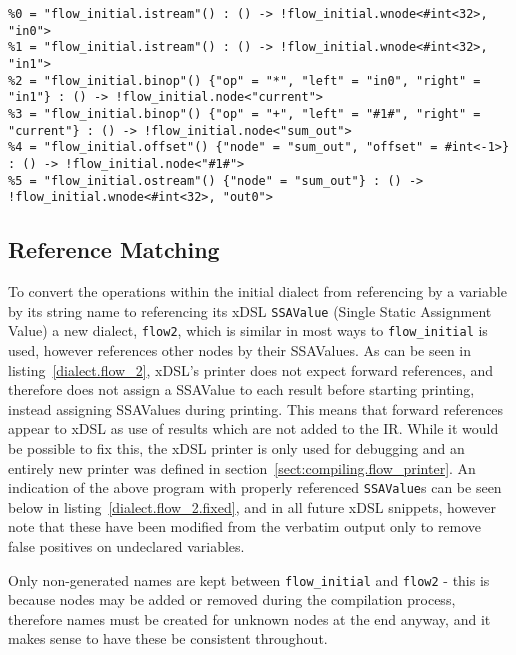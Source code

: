 \renewcommand\theFancyVerbLine{\arabic{FancyVerbLine}}
\makeatletter
{}
\def\dontdofcolorbox{\renewcommand\fcolorbox[4][]{##4}}
\makeatother
\begin{listing}[H]
  \begin{verbatim}
%0 = "flow_initial.istream"() : () -> !flow_initial.wnode<#int<32>, "in0">
%1 = "flow_initial.istream"() : () -> !flow_initial.wnode<#int<32>, "in1">
%2 = "flow_initial.binop"() {"op" = "*", "left" = "in0", "right" = "in1"} : () -> !flow_initial.node<"current">
%3 = "flow_initial.binop"() {"op" = "+", "left" = "#1#", "right" = "current"} : () -> !flow_initial.node<"sum_out">
%4 = "flow_initial.offset"() {"node" = "sum_out", "offset" = #int<-1>} : () -> !flow_initial.node<"#1#">
%5 = "flow_initial.ostream"() {"node" = "sum_out"} : () -> !flow_initial.wnode<#int<32>, "out0">  
  \end{verbatim}
  \cprotect\caption{An implementation of an inner product in the \lstinline|flow_initial| dialect}
  \label{dialect.flow_initial}
\end{listing}

\subsection{Reference Matching}
To convert the operations within the initial dialect from referencing by a variable by its string name to referencing its xDSL \lstinline|SSAValue| (Single Static Assignment Value) a new dialect, \lstinline|flow2|, which is similar in most ways to \lstinline|flow_initial| is used, however references other nodes by their SSAValues. As can be seen in listing \ref{dialect.flow_2}, xDSL's printer does not expect forward references, and therefore does not assign a SSAValue to each result before starting printing, instead assigning SSAValues during printing. This means that forward references appear to xDSL as use of results which are not added to the IR. While it would be possible to fix this, the xDSL printer is only used for debugging and an entirely new printer was defined in section \ref{sect:compiling.flow_printer}. An indication of the above program with properly referenced \lstinline|SSAValue|s can be seen below in listing \ref{dialect.flow_2.fixed}, and in all future xDSL snippets, however note that these have been modified from the verbatim output only to remove false positives on undeclared variables.

Only non-generated names are kept between \lstinline|flow_initial| and \lstinline|flow2| \hyphen{} this is because nodes may be added or removed during the compilation process, therefore names must be created for unknown nodes at the end anyway, and it makes sense to have these be consistent throughout.

